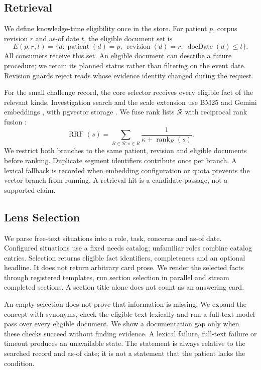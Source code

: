 \documentclass[10pt]{article}
\begin{document}
\subsection{Retrieval}
We define knowledge-time eligibility once in the store. For patient $p$, corpus
revision $r$ and as-of date $t$, the eligible document set is
\begin{equation}
 E(p,r,t)=\{d:\operatorname{patient}(d)=p,\ 
 \operatorname{revision}(d)=r,\ \operatorname{docDate}(d)\leq t\}.
\end{equation}
All consumers receive this set. An eligible document can describe a future procedure;
we retain its planned status rather than filtering on the event date. Revision guards
reject reads whose evidence identity changed during the request.

For the small challenge record, the core selector receives every eligible fact of
the relevant kinds. Investigation search and the scale extension use BM25
\citep{bm25} and Gemini embeddings \citep{gemini}, with pgvector storage
\citep{pgvector}. We fuse rank lists $\mathcal R$ with reciprocal rank fusion
\citep{rrf}:
\begin{equation}
 \operatorname{RRF}(s)=\sum_{R\in\mathcal R:s\in R}
 \frac{1}{\kappa+\operatorname{rank}_{R}(s)}.
\end{equation}
We restrict both branches to the same patient, revision and eligible documents before
ranking. Duplicate segment identifiers contribute once per branch. A lexical fallback
is recorded when embedding configuration or quota prevents the vector branch from
running. A retrieval hit is a candidate passage, not a supported claim.

\subsection{Lens Selection}
We parse free-text situations into a role, task, concerns and as-of date. Configured
situations use a fixed needs catalog; unfamiliar roles combine catalog entries.
Selection returns eligible fact identifiers, completeness and an optional headline.
It does not return arbitrary card prose. We render the selected facts through
registered templates, run section selection in parallel and stream completed
sections. A section title alone does not count as an answering card.

An empty selection does not prove that information is missing. We expand the concept
with synonyms, check the eligible text lexically and run a full-text model pass over
every eligible document. We show a documentation gap only when these checks succeed
without finding evidence. A lexical failure, full-text failure or timeout produces
an unavailable state. The statement is always relative to the searched record and
as-of date; it is not a statement that the patient lacks the condition.
\end{document}
